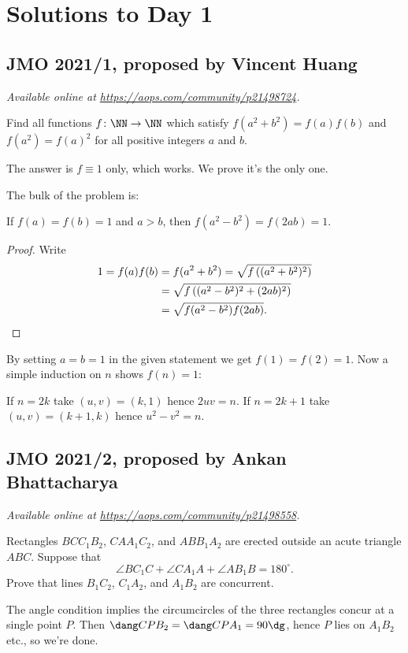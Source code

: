 \documentclass[11pt]{scrartcl}
\begin{document}
\section{Solutions to Day 1}
\subsection{JMO 2021/1, proposed by Vincent Huang}
\textsl{Available online at \url{https://aops.com/community/p21498724}.}
\begin{mdframed}[style=mdpurplebox,frametitle={Problem statement}]
Find all functions $f \colon \NN \to \NN$
which satisfy $f(a^2+b^2)=f(a)f(b)$ and
$f(a^2)=f(a)^2$ for all positive integers $a$ and $b$.
\end{mdframed}
The answer is $f \equiv 1$ only, which works.
We prove it's the only one.

The bulk of the problem is:
\begin{claim*}
  If $f(a)=f(b)=1$ and $a>b$, then $f(a^2-b^2)=f(2ab)=1$.
\end{claim*}
\begin{proof}
  Write
  \begin{align*}
    1 = f(a)f(b) &= f(a^2+b^2) = \sqrt{f\left( (a^2+b^2)^2 \right)} \\
    &= \sqrt{f\left( (a^2-b^2)^2 + (2ab)^2 \right)} \\
    &= \sqrt{f(a^2-b^2) f(2ab)}. \qedhere
  \end{align*}
\end{proof}

By setting $a=b=1$ in the given statement
we get $f(1) = f(2) = 1$.
Now a simple induction on $n$ shows $f(n) = 1$:
\begin{itemize}
  \ii If $n = 2k$ take $(u,v) = (k,1)$ hence $2uv = n$.
  \ii If $n = 2k+1$ take $(u,v) = (k+1,k)$ hence $u^2-v^2=n$.
\end{itemize}
\pagebreak

\subsection{JMO 2021/2, proposed by Ankan Bhattacharya}
\textsl{Available online at \url{https://aops.com/community/p21498558}.}
\begin{mdframed}[style=mdpurplebox,frametitle={Problem statement}]
Rectangles $BCC_1B_2$, $CAA_1C_2$, and $ABB_1A_2$ are erected
outside an acute triangle $ABC$. Suppose that
\[ \angle BC_1C + \angle CA_1A + \angle AB_1B = 180^\circ. \]
Prove that lines $B_1C_2$, $C_1A_2$, and $A_1B_2$ are concurrent.
\end{mdframed}
The angle condition implies the circumcircles of the three
rectangles concur at a single point $P$.
Then $\dang C P B_2 = \dang C P A_1 = 90\dg$,
hence $P$ lies on $A_1 B_2$ etc., so we're done.
\end{document}
